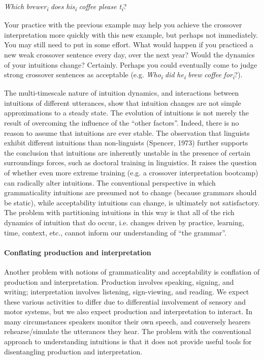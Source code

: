     \textit{Which} \textit{brewer\textsubscript{i}} \textit{does} \textit{his\textsubscript{i}} \textit{coffee} \textit{please} \textit{t\textsubscript{i}}?

  Your practice with the previous example may help you achieve the crossover interpretation more quickly with this new example, but perhaps not immediately. You may still need to put in some effort. What would happen if you practiced a new weak crossover sentence every day, over the next year? Would the dynamics of your intuitions change? Certainly. Perhaps you could eventually come to judge strong crossover sentences as acceptable (e.g. \textit{Who\textsubscript{i}} \textit{did} \textit{he\textsubscript{i}} \textit{brew} \textit{coffee} \textit{for\textsubscript{i}}?). 

  The multi-timescale nature of intuition dynamics, and interactions between intuitions of different utterances, show that intuition changes are not simple approximations to a steady state. The evolution of intuitions is not merely the result of overcoming the influence of the “other factors”. Indeed, there is no reason to assume that intuitions are ever stable. The observation that linguists exhibit different intuitions than non-linguists (Spencer, 1973) further supports the conclusion that intuitions are inherently unstable in the presence of certain surroundings forces, such as doctoral training in linguistics. It raises the question of whether even more extreme training (e.g. a crossover interpretation bootcamp) can radically alter intuitions. The conventional perspective in which grammaticality intuitions are presumed not to change (because grammars should be static), while acceptability intuitions can change, is ultimately not satisfactory. The problem with partitioning intuitions in this way is that all of the rich dynamics of intuition that do occur, i.e. changes driven by practice, learning, time, context, etc., cannot inform our understanding of “the grammar”.

\paragraph{Conflating production and interpretation}

Another problem with notions of grammaticality and acceptability is conflation of production and interpretation. Production involves speaking, signing, and writing; interpretation involves listening, sign-viewing, and reading. We expect these various activities to differ due to differential involvement of sensory and motor systems, but we also expect production and interpretation to interact. In many circumstances speakers monitor their own speech, and conversely hearers rehearse/simulate the utterances they hear. The problem with the conventional approach to understanding intuitions is that it does not provide useful tools for disentangling production and interpretation.

